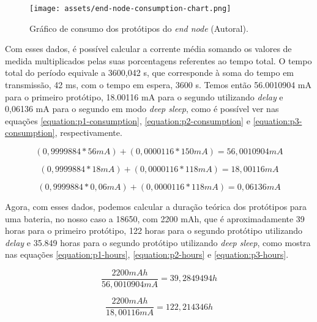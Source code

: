 \begin{figure}[H]
  \centering
  \texttt{[image: assets/end-node-consumption-chart.png]} 
  \caption{Gráfico de consumo dos protótipos do \textit{end node} (Autoral).}
  \label{fig:end-node-consumption-chart} 
\end{figure}

Com esses dados, é possível calcular a corrente média somando os valores de medida multiplicados pelas suas porcentagens referentes ao tempo total. O tempo total do período equivale a 3600,042 s, que corresponde à soma do tempo em transmissão, 42 ms, com o tempo em espera, 3600 s. Temos então 56.0010904 mA para o primeiro protótipo, 18.00116 mA para o segundo utilizando \textit{delay} e 0,06136 mA para o segundo em modo \textit{deep sleep}, como é possível ver nas equações \ref{equation:p1-consumption}, \ref{equation:p2-consumption} e \ref{equation:p3-consumption}, respectivamente.

\begin{equation}
  (0,9999884 * 56 mA) + (0,0000116 * 150 mA) = 56,0010904 mA
  \label{equation:p1-consumption} 
\end{equation}

\begin{equation}
  (0,9999884 * 18 mA) + (0,0000116 * 118 mA) = 18,00116 mA
  \label{equation:p2-consumption} 
\end{equation}

\begin{equation}
  (0,9999884 * 0,06 mA) + (0,0000116 * 118 mA) = 0,06136 mA
  \label{equation:p3-consumption} 
\end{equation}

Agora, com esses dados, podemos calcular a duração teórica dos protótipos  para uma bateria, no nosso caso a 18650, com 2200 mAh, que é aproximadamente 39 horas para o primeiro protótipo, 122 horas para o segundo protótipo utilizando \textit{delay} e 35.849 horas para o segundo protótipo utilizando \textit{deep sleep}, como mostra nas equações \ref{equation:p1-hours}, \ref{equation:p2-hours} e \ref{equation:p3-hours}.

\begin{equation}
  \frac{2200 mAh}{56,0010904 mA} = 39,2849494 h
  \label{equation:p1-hours} 
\end{equation}

\begin{equation}
  \frac{2200 mAh}{18,00116 mA} = 122,214346 h
  \label{equation:p2-hours} 
\end{equation}

